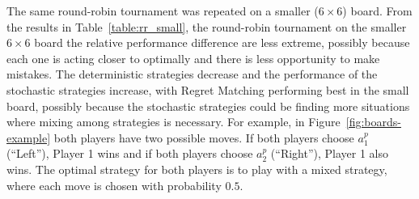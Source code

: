\documentclass{article}
\begin{document}
%
The same round-robin tournament was repeated on a smaller ($6 \times 6$) board. 
From the results in Table~\ref{table:rr_small}, 
the round-robin tournament on the smaller $6 \times 6$ board the relative performance difference are less extreme, possibly
because each one is acting closer to optimally and there is less opportunity to make mistakes.
The deterministic strategies decrease and the performance of the stochastic strategies increase, with Regret Matching 
performing best in the small board, possibly because the stochastic strategies could be finding more situations where mixing 
among strategies is necessary. 
For example, in Figure~\ref{fig:boards-example} both players have two possible moves. If both players choose $a^{p}_{1}$ (``Left''), Player 1 wins and if both players choose $a^{p}_{2}$ (``Right''), Player 1 also wins. The optimal strategy for both players is to play with a mixed strategy, where each move is chosen with probability $0.5$. 


\end{document}
